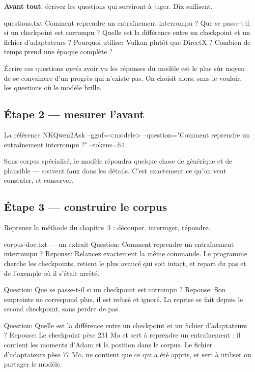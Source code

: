 \textbf{Avant tout}, écrivez les questions qui serviront à juger. Dix suffisent.

\begin{nkcode}[]{questions.txt}
Comment reprendre un entraînement interrompu ?
Que se passe-t-il si un checkpoint est corrompu ?
Quelle est la différence entre un checkpoint et un fichier d'adaptateurs ?
Pourquoi utiliser Vulkan plutôt que DirectX ?
Combien de temps prend une époque complète ?
\end{nkcode}

\begin{nkpiege}
Écrire ces questions \emph{après} avoir vu les réponses du modèle est le plus sûr
moyen de se convaincre d'un progrès qui n'existe pas. On choisit alors, sans le
vouloir, les questions où le modèle brille.
\end{nkpiege}

\subsection{Étape 2 — mesurer l'avant}

\begin{nkcode}[]{La référence}
NKQwen2Ask --gguf=<modele> --question="Comment reprendre un entraînement
interrompu ?" --tokens=64
\end{nkcode}

Sans corpus spécialisé, le modèle répondra quelque chose de générique et de
plausible — souvent faux dans les détails. C'est exactement ce qu'on veut
constater, et conserver.

\subsection{Étape 3 — construire le corpus}

Reprenez la méthode du chapitre~3 : découper, interroger, répondre.

\begin{nkcode}[]{corpus-doc.txt — un extrait}
Question: Comment reprendre un entraînement interrompu ?
Reponse: Relancez exactement la même commande. Le programme cherche les
checkpoints, retient le plus avancé qui soit intact, et repart du pas et
de l'exemple où il s'était arrêté.

Question: Que se passe-t-il si un checkpoint est corrompu ?
Reponse: Son empreinte ne correspond plus, il est refusé et ignoré. La
reprise se fait depuis le second checkpoint, sans perdre de pas.

Question: Quelle est la différence entre un checkpoint et un fichier
d'adaptateurs ?
Reponse: Le checkpoint pèse 231 Mo et sert à reprendre un entraînement :
il contient les moments d'Adam et la position dans le corpus. Le fichier
d'adaptateurs pèse 77 Mo, ne contient que ce qui a été appris, et sert à
utiliser ou partager le modèle.
\end{nkcode}

